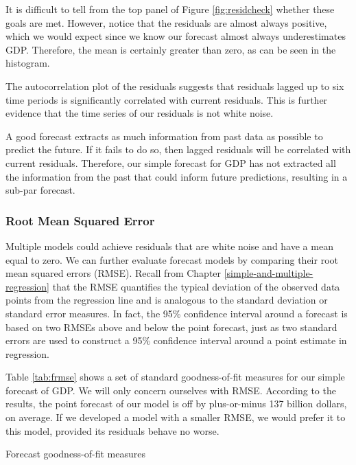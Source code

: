 \documentclass[
]{book}
\begin{document}
It is difficult to tell from the top panel of Figure \ref{fig:residcheck} whether these goals are met. However, notice that the residuals are almost always positive, which we would expect since we know our forecast almost always underestimates GDP. Therefore, the mean is certainly greater than zero, as can be seen in the histogram.

The autocorrelation plot of the residuals suggests that residuals lagged up to six time periods is significantly correlated with current residuals. This is further evidence that the time series of our residuals is not white noise.

A good forecast extracts as much information from past data as possible to predict the future. If it fails to do so, then lagged residuals will be correlated with current residuals. Therefore, our simple forecast for GDP has not extracted all the information from the past that could inform future predictions, resulting in a sub-par forecast.

\hypertarget{root-mean-squared-error}{%
\subsubsection*{Root Mean Squared Error}\label{root-mean-squared-error}}

Multiple models could achieve residuals that are white noise and have a mean equal to zero. We can further evaluate forecast models by comparing their root mean squared errors (RMSE). Recall from Chapter \ref{simple-and-multiple-regression} that the RMSE quantifies the typical deviation of the observed data points from the regression line and is analogous to the standard deviation or standard error measures. In fact, the 95\% confidence interval around a forecast is based on two RMSEs above and below the point forecast, just as two standard errors are used to construct a 95\% confidence interval around a point estimate in regression.

Table \ref{tab:frmse} shows a set of standard goodness-of-fit measures for our simple forecast of GDP. We will only concern ourselves with RMSE. According to the results, the point forecast of our model is off by plus-or-minus 137 billion dollars, on average. If we developed a model with a smaller RMSE, we would prefer it to this model, provided its residuals behave no worse.

\label{tab:frmse}Forecast goodness-of-fit measures
\end{document}
